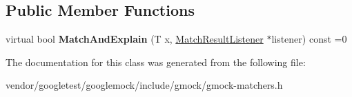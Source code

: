 \subsection*{Public Member Functions}
\begin{DoxyCompactItemize}
\item 
\mbox{\label{classtesting_1_1_matcher_interface_a296b43607cd99d60365f0e6a762777cf}} 
virtual bool {\bfseries Match\+And\+Explain} (T x, \hyperlink{classtesting_1_1_match_result_listener}{Match\+Result\+Listener} $\ast$listener) const =0
\end{DoxyCompactItemize}


The documentation for this class was generated from the following file\+:\begin{DoxyCompactItemize}
\item 
vendor/googletest/googlemock/include/gmock/gmock-\/matchers.\+h\end{DoxyCompactItemize}
